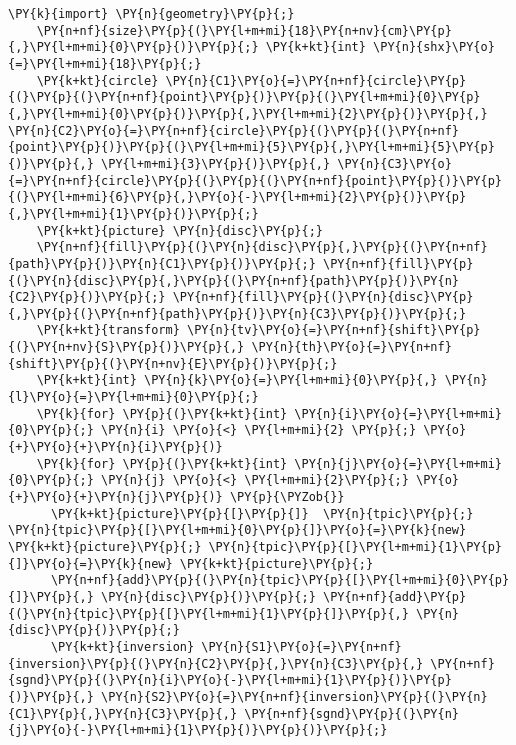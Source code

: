 \begin{Verbatim}[commandchars=\\\{\}]
    \PY{k}{import} \PY{n}{geometry}\PY{p}{;}
    \PY{n+nf}{size}\PY{p}{(}\PY{l+m+mi}{18}\PY{n+nv}{cm}\PY{p}{,}\PY{l+m+mi}{0}\PY{p}{)}\PY{p}{;} \PY{k+kt}{int} \PY{n}{shx}\PY{o}{=}\PY{l+m+mi}{18}\PY{p}{;}
    \PY{k+kt}{circle} \PY{n}{C1}\PY{o}{=}\PY{n+nf}{circle}\PY{p}{(}\PY{p}{(}\PY{n+nf}{point}\PY{p}{)}\PY{p}{(}\PY{l+m+mi}{0}\PY{p}{,}\PY{l+m+mi}{0}\PY{p}{)}\PY{p}{,}\PY{l+m+mi}{2}\PY{p}{)}\PY{p}{,} \PY{n}{C2}\PY{o}{=}\PY{n+nf}{circle}\PY{p}{(}\PY{p}{(}\PY{n+nf}{point}\PY{p}{)}\PY{p}{(}\PY{l+m+mi}{5}\PY{p}{,}\PY{l+m+mi}{5}\PY{p}{)}\PY{p}{,} \PY{l+m+mi}{3}\PY{p}{)}\PY{p}{,} \PY{n}{C3}\PY{o}{=}\PY{n+nf}{circle}\PY{p}{(}\PY{p}{(}\PY{n+nf}{point}\PY{p}{)}\PY{p}{(}\PY{l+m+mi}{6}\PY{p}{,}\PY{o}{-}\PY{l+m+mi}{2}\PY{p}{)}\PY{p}{,}\PY{l+m+mi}{1}\PY{p}{)}\PY{p}{;}
    \PY{k+kt}{picture} \PY{n}{disc}\PY{p}{;}
    \PY{n+nf}{fill}\PY{p}{(}\PY{n}{disc}\PY{p}{,}\PY{p}{(}\PY{n+nf}{path}\PY{p}{)}\PY{n}{C1}\PY{p}{)}\PY{p}{;} \PY{n+nf}{fill}\PY{p}{(}\PY{n}{disc}\PY{p}{,}\PY{p}{(}\PY{n+nf}{path}\PY{p}{)}\PY{n}{C2}\PY{p}{)}\PY{p}{;} \PY{n+nf}{fill}\PY{p}{(}\PY{n}{disc}\PY{p}{,}\PY{p}{(}\PY{n+nf}{path}\PY{p}{)}\PY{n}{C3}\PY{p}{)}\PY{p}{;}
    \PY{k+kt}{transform} \PY{n}{tv}\PY{o}{=}\PY{n+nf}{shift}\PY{p}{(}\PY{n+nv}{S}\PY{p}{)}\PY{p}{,} \PY{n}{th}\PY{o}{=}\PY{n+nf}{shift}\PY{p}{(}\PY{n+nv}{E}\PY{p}{)}\PY{p}{;}
    \PY{k+kt}{int} \PY{n}{k}\PY{o}{=}\PY{l+m+mi}{0}\PY{p}{,} \PY{n}{l}\PY{o}{=}\PY{l+m+mi}{0}\PY{p}{;}
    \PY{k}{for} \PY{p}{(}\PY{k+kt}{int} \PY{n}{i}\PY{o}{=}\PY{l+m+mi}{0}\PY{p}{;} \PY{n}{i} \PY{o}{<} \PY{l+m+mi}{2} \PY{p}{;} \PY{o}{+}\PY{o}{+}\PY{n}{i}\PY{p}{)}
    \PY{k}{for} \PY{p}{(}\PY{k+kt}{int} \PY{n}{j}\PY{o}{=}\PY{l+m+mi}{0}\PY{p}{;} \PY{n}{j} \PY{o}{<} \PY{l+m+mi}{2}\PY{p}{;} \PY{o}{+}\PY{o}{+}\PY{n}{j}\PY{p}{)} \PY{p}{\PYZob{}}
      \PY{k+kt}{picture}\PY{p}{[}\PY{p}{]}  \PY{n}{tpic}\PY{p}{;} \PY{n}{tpic}\PY{p}{[}\PY{l+m+mi}{0}\PY{p}{]}\PY{o}{=}\PY{k}{new} \PY{k+kt}{picture}\PY{p}{;} \PY{n}{tpic}\PY{p}{[}\PY{l+m+mi}{1}\PY{p}{]}\PY{o}{=}\PY{k}{new} \PY{k+kt}{picture}\PY{p}{;}
      \PY{n+nf}{add}\PY{p}{(}\PY{n}{tpic}\PY{p}{[}\PY{l+m+mi}{0}\PY{p}{]}\PY{p}{,} \PY{n}{disc}\PY{p}{)}\PY{p}{;} \PY{n+nf}{add}\PY{p}{(}\PY{n}{tpic}\PY{p}{[}\PY{l+m+mi}{1}\PY{p}{]}\PY{p}{,} \PY{n}{disc}\PY{p}{)}\PY{p}{;}
      \PY{k+kt}{inversion} \PY{n}{S1}\PY{o}{=}\PY{n+nf}{inversion}\PY{p}{(}\PY{n}{C2}\PY{p}{,}\PY{n}{C3}\PY{p}{,} \PY{n+nf}{sgnd}\PY{p}{(}\PY{n}{i}\PY{o}{-}\PY{l+m+mi}{1}\PY{p}{)}\PY{p}{)}\PY{p}{,} \PY{n}{S2}\PY{o}{=}\PY{n+nf}{inversion}\PY{p}{(}\PY{n}{C1}\PY{p}{,}\PY{n}{C3}\PY{p}{,} \PY{n+nf}{sgnd}\PY{p}{(}\PY{n}{j}\PY{o}{-}\PY{l+m+mi}{1}\PY{p}{)}\PY{p}{)}\PY{p}{;}

\end{Verbatim}
